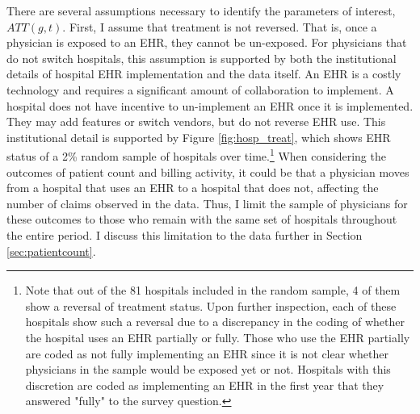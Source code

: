 \documentclass[12pt]{article}
\begin{document}
There are several assumptions necessary to identify the parameters of interest, $ATT(g,t)$. First, I assume that treatment is not reversed. That is, once a physician is exposed to an EHR, they cannot be un-exposed. For physicians that do not switch hospitals, this assumption is supported by both the institutional details of hospital EHR implementation and the data itself. An EHR is a costly technology and requires a significant amount of collaboration to implement. A hospital does not have incentive to un-implement an EHR once it is implemented. They may add features or switch vendors, but do not reverse EHR use. This institutional detail is supported by Figure \ref{fig:hosp_treat}, which shows EHR status of a 2\% random sample of hospitals over time.\footnote{Note that out of the 81 hospitals included in the random sample, 4 of them show a reversal of treatment status. Upon further inspection, each of these hospitals show such a reversal due to a discrepancy in the coding of whether the hospital uses an EHR partially or fully. Those who use the EHR partially are coded as not fully implementing an EHR since it is not clear whether physicians in the sample would be exposed yet or not. Hospitals with this discretion are coded as implementing an EHR in the first year that they answered "fully" to the survey question.} When considering the outcomes of patient count and billing activity, it could be that a physician moves from a hospital that uses an EHR to a hospital that does not, affecting the number of claims observed in the data. Thus, I limit the sample of physicians for these outcomes to those who remain with the same set of hospitals throughout the entire period. I discuss this limitation to the data further in Section \ref{sec:patientcount}.
\end{document}
